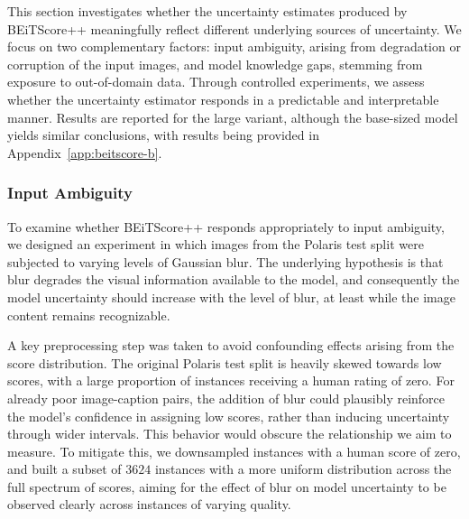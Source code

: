 \documentclass[11pt]{article}
\begin{document}
This section investigates whether the uncertainty estimates produced by BEiTScore++ meaningfully reflect different underlying sources of uncertainty. We focus on two complementary factors: input ambiguity, arising from degradation or corruption of the input images, and model knowledge gaps, stemming from exposure to out-of-domain data. Through controlled experiments, we assess whether the uncertainty estimator responds in a predictable and interpretable manner. Results are reported for the large variant, although the base-sized model yields similar conclusions, with results being provided in Appendix~\ref{app:beitscore-b}.

\vspace{-0.13cm}
\subsubsection{Input Ambiguity}
\vspace{-0.13cm}

To examine whether BEiTScore++ responds appropriately to input ambiguity, we designed an experiment in which images from the Polaris test split were subjected to varying levels of Gaussian blur. The underlying hypothesis is that blur degrades the visual information available to the model, and consequently the model uncertainty should increase with the level of blur, at least while the image content remains recognizable.

A key preprocessing step was taken to avoid confounding effects arising from the score distribution. The original Polaris test split is heavily skewed towards low scores, with a large proportion of instances receiving a human rating of zero. For already poor image-caption pairs, the addition of blur could plausibly reinforce the model's confidence in assigning low scores, rather than inducing uncertainty through wider intervals. This behavior would obscure the relationship we aim to measure. To mitigate this, we downsampled instances with a human score of zero, and built a subset of $3624$ instances with a more uniform distribution across the full spectrum of scores, aiming for the effect of blur on model uncertainty to be observed clearly across instances of varying quality.
\end{document}
